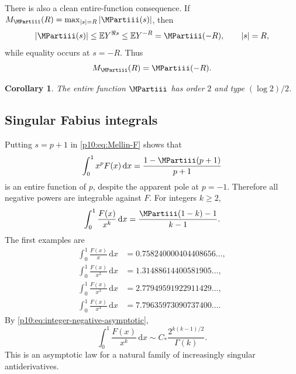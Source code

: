 \documentclass[11pt,oneside]{article}
\newtheorem{corollary}[theorem]{Corollary}
\theoremstyle{definition}
\theoremstyle{remark}
\newcommand{\F}{F}
\newcommand{\E}{\mathbb E}
\newcommand{\dd}{\,\mathrm d}
\newcommand{\1}{\mathbf 1}
\begin{document}
There is also a clean entire-function consequence.  If
\(M_{\MPartiii}(R)=\max_{|s|=R}|\MPartiii(s)|\), then
\begin{equation}\label{p10:eq:maxmod-equality}
 |\MPartiii(s)|\le\E Y^{\Re s}\le\E Y^{-R}=\MPartiii(-R),
 \qquad |s|=R,
\end{equation}
while equality occurs at \(s=-R\).  Thus
\begin{equation}\label{p10:eq:maxmod-exact}
 M_{\MPartiii}(R)=\MPartiii(-R).
\end{equation}

\begin{corollary}\label{p10:cor:order-type}
The entire function \(\MPartiii\) has order \(2\) and type \((\log2)/2\).
\end{corollary}

\subsection{Singular Fabius integrals}

Putting \(s=p+1\) in \cref{p10:eq:Mellin-F} shows that
\begin{equation}\label{p10:eq:weighted-F-complete}
 \int_0^1x^p\F(x)\dd x
 =\frac{1-\MPartiii(p+1)}{p+1}
\end{equation}
is an entire function of \(p\), despite the apparent pole at \(p=-1\).  Therefore
all negative powers are integrable against \(\F\).  For integers \(k\ge2\),
\begin{equation}\label{p10:eq:singular-F-integers}
 \int_0^1\frac{\F(x)}{x^k}\dd x
 =\frac{\MPartiii(1-k)-1}{k-1}.
\end{equation}
The first examples are
\begin{align}
 \int_0^1\frac{\F(x)}{x}\dd x
 &=0.758240000404408656\ldots,\nonumber\\
 \int_0^1\frac{\F(x)}{x^2}\dd x
 &=1.31488614400581905\ldots,\nonumber\\
 \int_0^1\frac{\F(x)}{x^3}\dd x
 &=2.77949591922911429\ldots,\nonumber\\
 \int_0^1\frac{\F(x)}{x^4}\dd x
 &=7.79635973090737400\ldots.\label{p10:eq:singular-F-values}
\end{align}
By \cref{p10:eq:integer-negative-asymptotic},
\begin{equation}\label{p10:eq:singular-F-asymptotic}
 \int_0^1\frac{\F(x)}{x^k}\dd x
 \sim C_*\frac{2^{k(k-1)/2}}{\Gamma(k)}.
\end{equation}
This is an asymptotic law for a natural family of increasingly singular antiderivatives.
\end{document}
